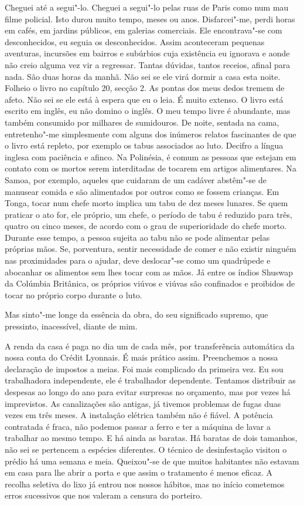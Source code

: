 Cheguei até a segui"-lo. Cheguei a segui"-lo pelas ruas de Paris como num
mau filme policial. Isto durou muito tempo, meses ou anos. Disfarcei"-me,
perdi horas em cafés, em jardins públicos, em galerias comerciais. Ele
encontrava"-se com desconhecidos, eu seguia os desconhecidos. Assim
aconteceram pequenas aventuras, incursões em bairros e subúrbios cuja existência
eu ignorava e aonde não creio alguma vez vir a regressar. Tantas
dúvidas, tantos receios, afinal para nada. São duas horas da manhã. Não
sei se ele virá dormir a casa esta noite. Folheio o livro no capítulo
20, secção 2. As pontas dos meus dedos tremem de afeto. Não sei se ele
está à espera que eu o leia. É muito extenso. O livro está escrito em
inglês, eu não domino o inglês. O meu tempo livre é abundante, mas
também consumido por milhares de sumidouros. De noite, sentada na cama,
entretenho"-me simplesmente com alguns dos inúmeros relatos fascinantes
de que o livro está repleto, por exemplo os tabus associados ao luto.
Decifro a língua inglesa com paciência e afinco. Na Polinésia, é comum
as pessoas que estejam em contato com os mortos serem interditadas de
tocarem em artigos alimentares. Na Samoa, por exemplo, aqueles que
cuidaram de um cadáver abstêm"-se de manusear comida e são alimentados
por outros como se fossem crianças. Em Tonga, tocar num chefe morto
implica um tabu de dez meses lunares. Se quem praticar o ato for, ele
próprio, um chefe, o período de tabu é reduzido para três, quatro ou
cinco meses, de acordo com o grau de superioridade do chefe morto.
Durante esse tempo, a pessoa sujeita ao tabu não se pode alimentar pelas
próprias mãos. Se, porventura, sentir necessidade de comer e não
existir ninguém nas proximidades para o ajudar, deve deslocar"-se como um
quadrúpede e abocanhar os alimentos sem lhes tocar com as mãos. Já entre
os índios Shuswap da Colúmbia Britânica, os próprios viúvos e viúvas são
confinados e proibidos de tocar no próprio corpo durante o luto.

Mas sinto"-me longe da essência da obra, do seu significado
supremo, que pressinto, inacessível, diante de mim.


A renda da casa é paga no dia um de cada mês, por transferência
automática da nossa conta do Crédit Lyonnais. É mais prático assim.
Preenchemos a nossa declaração de impostos a meias. Foi mais
complicado da primeira vez. Eu sou trabalhadora independente, ele é
trabalhador dependente. Tentamos distribuir as despesas ao longo do ano
para evitar surpresas no orçamento, mas por vezes há imprevistos. As
canalizações são antigas, já tivemos problemas de fugas duas vezes em
três meses. A instalação elétrica também não é fiável. A potência
contratada é fraca, não podemos passar a ferro e ter a máquina de lavar
a trabalhar ao mesmo tempo. E há ainda as baratas. Há baratas de dois
tamanhos, não sei se pertencem a espécies diferentes. O técnico de
desinfestação visitou o prédio há uma semana e meia. Queixou"-se de que
muitos habitantes não estavam em casa para lhe abrir a porta e que assim
o tratamento é menos eficaz. A recolha seletiva do lixo já entrou nos
nossos hábitos, mas no início cometemos erros sucessivos que nos valeram
a censura do porteiro.

